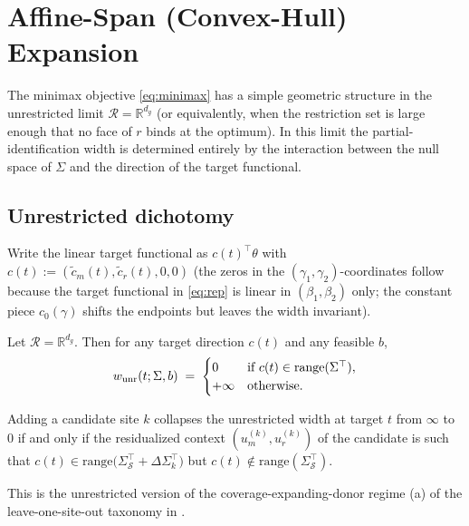 \section{Affine-Span (Convex-Hull) Expansion}
\label{sec:hull}

The minimax objective \eqref{eq:minimax} has a simple geometric structure in the
unrestricted limit $\mathcal{R} = \mathbb{R}^{d_g}$ (or equivalently, when the
restriction set is large enough that no face of $r$ binds at the optimum). In
this limit the partial-identification width is determined entirely by the
interaction between the null space of $\Sigma$ and the direction of the target
functional.

\subsection{Unrestricted dichotomy}
\label{sec:hull-dichotomy}

Write the linear target functional as $c(t)^\top \theta$ with
$c(t) := (\tilde c_m(t), \tilde c_r(t), 0, 0)$ (the zeros in the
$(\gamma_1, \gamma_2)$-coordinates follow because the target functional in
\eqref{eq:rep} is linear in $(\beta_1, \beta_2)$ only; the constant piece
$c_0(\gamma)$ shifts the endpoints but leaves the width invariant).

\begin{proposition}
\label{prop:dichotomy}
Let $\mathcal{R} = \mathbb{R}^{d_g}$. Then for any target direction $c(t)$ and
any feasible $b$,
\[
w_{\rm unr}(t; \Sigma, b) \;=\;
 \begin{cases}
  0 & \text{if } c(t)\in \mathrm{range}(\Sigma^\top), \\
  +\infty & \text{otherwise.}
 \end{cases}
\]
\end{proposition}

\begin{corollary}
\label{cor:collapse}
Adding a candidate site $k$ collapses the unrestricted width at target $t$ from
$\infty$ to $0$ if and only if the residualized context $(u_m^{(k)}, u_r^{(k)})$
of the candidate is such that
$c(t) \in \mathrm{range}\!\bigl(\Sigma_\mathcal{S}^\top + \Delta\Sigma_k^\top\bigr)$
but $c(t) \notin \mathrm{range}(\Sigma_\mathcal{S}^\top)$.
\end{corollary}

This is the unrestricted version of the coverage-expanding-donor regime
(a) of the leave-one-site-out taxonomy in \citet[\S4.4]{boyarsky2026}.

